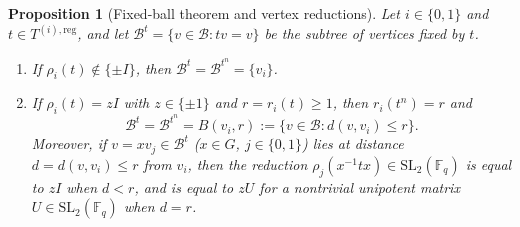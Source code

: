\documentclass[12pt, letterpaper]{article}
\numberwithin{equation}{section}
\newtheorem{proposition}[theorem]{Proposition}
\theoremstyle{definition}
\theoremstyle{remark}
\newcommand{\kk}{\mathbb{F}_q}
\newcommand{\Gbar}{\mathrm{SL}_2(\kk)}
\begin{document}
\begin{proposition}[Fixed-ball theorem and vertex reductions]\label{prop:ball}
Let $i\in\{0,1\}$ and $t\in T^{(i),\mathrm{reg}}$, and let $\mathscr{B}^t=\{v\in\mathscr{B}:tv=v\}$ be the subtree of vertices fixed by $t$.
\begin{enumerate}[label=(\roman*)]
 \item If $\rho_i(t)\notin\{\pm I\}$, then $\mathscr{B}^t=\mathscr{B}^{t^n}=\{v_i\}$.
 \item If $\rho_i(t)=zI$ with $z\in\{\pm 1\}$ and $r=r_i(t)\ge 1$, then $r_i(t^n)=r$ and
 \begin{equation}\label{eq:fixed-ball}
  \mathscr{B}^t=\mathscr{B}^{t^n}=B(v_i,r):=\bigl\{v\in\mathscr{B}:d(v,v_i)\le r\bigr\}.
 \end{equation}
 Moreover, if $v=xv_j\in\mathscr{B}^t$ ($x\in G$, $j\in\{0,1\}$) lies at distance $d=d(v,v_i)\le r$ from $v_i$, then the reduction $\rho_j(x^{-1}tx)\in\Gbar$ is equal to $zI$ when $d<r$, and is equal to $zU$ for a nontrivial unipotent matrix $U\in\Gbar$ when $d=r$.
\end{enumerate}
\end{proposition}
\end{document}

